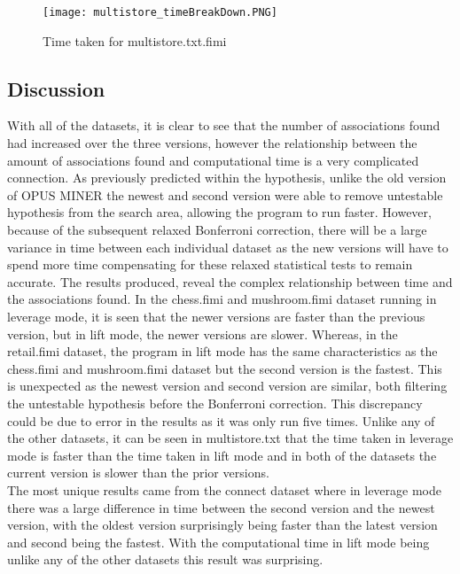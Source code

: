 \documentclass[10pt,a4paper]{article}
\begin{document}
\vspace{2cm}

\begin{figure}[h!]
\begin{center}
  \texttt{[image: multistore\_timeBreakDown.PNG]}
\end{center}
  \caption{Time taken for multistore.txt.fimi}
  \label{fig:SSPresults1}
\end{figure}

\pagebreak


\vspace{2cm}
\subsection{Discussion}
With all of the datasets, it is clear to see that the number of associations found had increased over the three versions, however the relationship between the amount of associations found and computational time is a very complicated connection. As previously predicted within the hypothesis, unlike the old version of OPUS MINER the newest and second version were able to remove untestable hypothesis from the search area, allowing the program to run faster. However, because of the subsequent relaxed Bonferroni correction, there will be a large variance in time between each individual dataset as the new versions will have to spend more time compensating for these relaxed statistical tests to remain accurate. The results produced, reveal the complex relationship between time and the associations found. In the chess.fimi and mushroom.fimi dataset running in leverage mode, it is seen that the newer versions are faster than the previous version, but in lift mode, the newer versions are slower. Whereas, in the retail.fimi dataset, the program in lift mode has the same characteristics as the chess.fimi and mushroom.fimi dataset but the second version is the fastest. This is unexpected as the newest version and second version are similar, both filtering the untestable hypothesis before the Bonferroni correction. This discrepancy could be due to error in the results as it was only run five times. Unlike any of the other datasets, it can be seen in multistore.txt that the time taken in leverage mode is faster than the time taken in lift mode and in both of the datasets the current version is slower than the prior versions.\\
The most unique results came from the connect dataset where in leverage mode there was a large difference in time between the second version and the newest version, with the oldest version surprisingly being faster than the latest version and second being the fastest. With the computational time in lift mode being unlike any of the other datasets this result was surprising.\\
\end{document}
